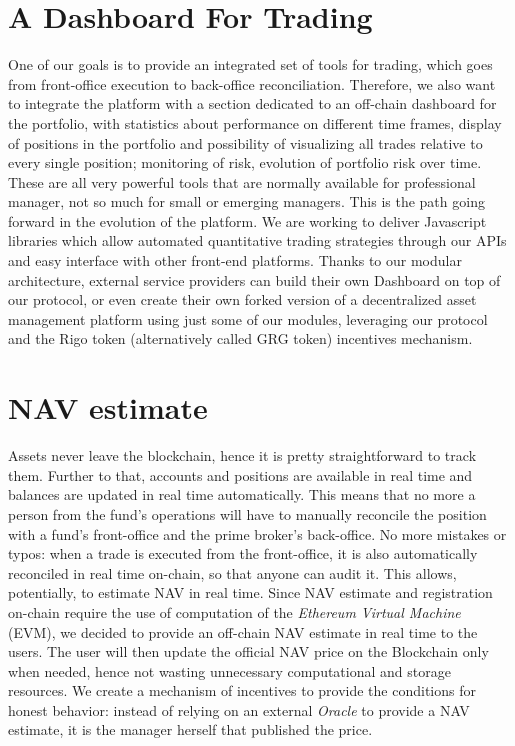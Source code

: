 \documentclass[9pt,oneside]{amsart}
\begin{document}
\begin{multicols}{2}
\section{A Dashboard For Trading} \label{ch:model}
One of our goals is to provide an integrated set of tools for trading, which goes from front-office execution to back-office reconciliation. Therefore, we also want to integrate the platform with a section dedicated to an off-chain dashboard for the portfolio, with statistics about performance on different time frames, display of positions in the portfolio and possibility of visualizing all trades relative to every single position; monitoring of risk, evolution of portfolio risk over time. These are all very powerful tools that are normally available for professional manager, not so much for small or emerging managers. This is the path going forward in the evolution of the platform.
We are working to deliver Javascript libraries which allow automated quantitative trading strategies through our APIs and easy interface with other front-end platforms.
Thanks to our modular architecture, external service providers can build their own Dashboard on top of our protocol, or even create their own forked version of a decentralized asset management platform using just some of our modules, leveraging our protocol and the Rigo token (alternatively called GRG token) incentives mechanism.

\section{NAV estimate} \label{ch:ghost}

Assets never leave the blockchain, hence it is pretty straightforward to track them. Further to that, accounts and positions are available in real time and balances are updated in real time automatically. This means that no more a person from the fund's operations will have to manually reconcile the position with a fund's front-office and the prime broker's back-office. No more mistakes or typos: when a trade is executed from the front-office, it is also automatically reconciled in real time on-chain, so that anyone can audit it. This allows, potentially, to estimate NAV in real time.
Since NAV estimate and registration on-chain require the use of computation of the \textit{Ethereum Virtual Machine} (EVM), we decided to provide an off-chain NAV estimate in real time to the users. The user will then update the official NAV price on the Blockchain only when needed, hence not wasting unnecessary computational and storage resources. We create a mechanism of incentives to provide the conditions for honest behavior: instead of relying on an external \textit{Oracle} to provide a NAV estimate, it is the manager herself that published the price.


\end{multicols}
\end{document}
